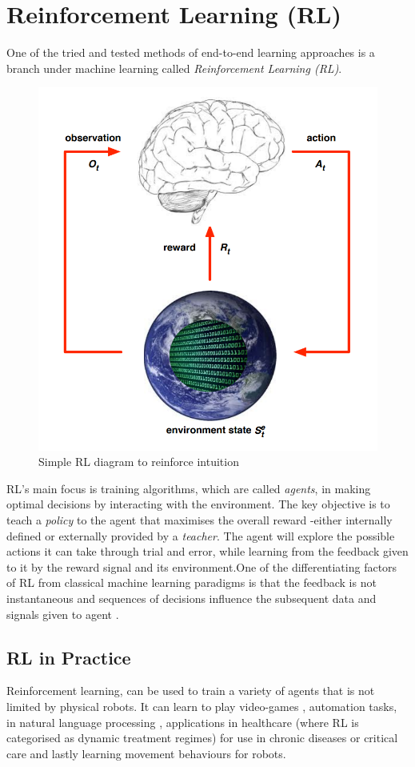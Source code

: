 \section{Reinforcement Learning (RL)}\label{sec:rl}
  One of the tried and tested methods of end-to-end learning approaches is a branch under machine learning called \emph{Reinforcement Learning (RL)}. 

  \begin{figure}[h]
    \centering
    \includegraphics[width=0.3\linewidth]{assets/background/silver-rl.png}
    \caption{Simple RL diagram to reinforce intuition \cite{silver2015}}\label{fig:rl-diag}
  \end{figure}

  RL's main focus is training algorithms, which are called \emph{agents}, in making optimal decisions by interacting with the environment. The key objective is to teach a \emph{policy} to the agent that maximises the overall reward -either internally defined or externally provided by a \emph{teacher}. The agent will explore the possible actions it can take through trial and error, while learning from the feedback given to it by the reward signal and its environment.One of the differentiating factors of RL from classical machine learning paradigms is that the feedback is not instantaneous and sequences of decisions influence the subsequent data and signals given to agent \cite{silver2015}.

\subsection{RL in Practice}
  Reinforcement learning, can be used to train a variety of agents that is not limited by physical robots. It can learn to play video-games \cite{comi2018}, automation tasks, in natural language processing \cite{paulus2017deepreinforcedmodelabstractive}, applications in healthcare (where RL is categorised as dynamic treatment regimes) for use in chronic diseases or critical care \cite{yu2020reinforcementlearninghealthcaresurvey} and lastly learning movement behaviours for robots.


